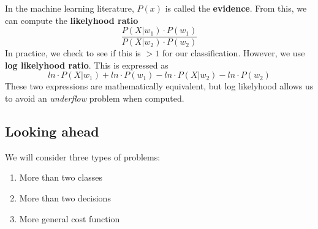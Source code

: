 \documentclass[12pt]{article}
\begin{document}
In the machine learning literature, $P(x)$ is called the \textbf{evidence}. From this, we can compute the \textbf{likelyhood ratio} \[\frac{P(X | w_1) \cdot P(w_1)}{P(X | w_2) \cdot P(w_2)}\] In practice, we check to see if this is $> 1$ for our classification. However, we use \textbf{log likelyhood ratio}. This is expressed as \[ln \cdot P(X | w_1) + ln \cdot P(w_1) - ln \cdot P(X | w_2) - ln \cdot P(w_2)\]These two expressions are mathematically equivalent, but log likelyhood allows us to avoid an \textit{underflow} problem when computed.

\subsection{Looking ahead}

We will consider three types of problems:

\begin{enumerate}[noitemsep]
\item More than two classes
\item More than two decisions
\item More general cost function
\end{enumerate}
\end{document}

